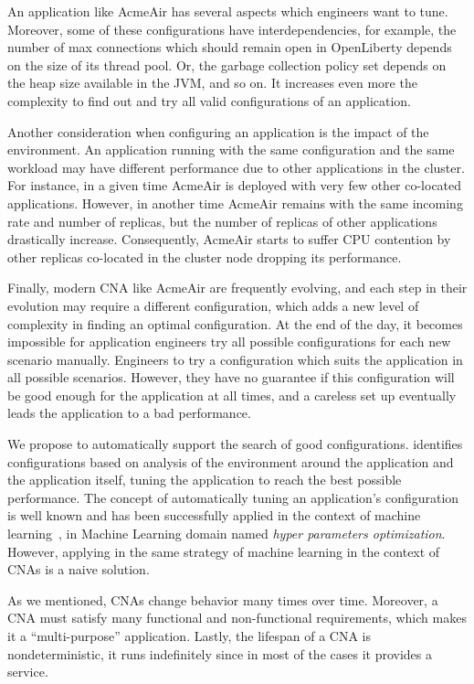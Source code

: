 An application like AcmeAir has several aspects which engineers want to tune.
Moreover, some of these configurations have interdependencies,
for example, the number of max connections which should remain open in
OpenLiberty depends on the size of its thread pool. Or, the garbage collection
policy set depends on the heap size available in the JVM, and so on. It
increases even more the complexity to find out and try all valid configurations
of an application.

Another consideration when configuring an application is the impact of the
environment. An application running with the same configuration and the same
workload may have different performance due to other applications in the
cluster. For instance, in a given time AcmeAir is deployed with very few other
co-located applications.  However, in another time AcmeAir remains with the same
incoming rate and number of replicas, but the number of replicas of other
applications drastically increase.  Consequently, AcmeAir starts to suffer CPU
contention by other replicas co-located in the cluster node dropping its
performance.

Finally, modern CNA like AcmeAir are frequently evolving, and each step in their
evolution may require a different configuration, which adds a new level of
complexity in finding an optimal configuration. At the end of the day, it
becomes impossible for application engineers try all possible configurations for
each new scenario manually. Engineers to try a configuration which suits the
application in all possible scenarios.  However, they have no guarantee if this
configuration will be good enough for the application at all times, and a
careless set up eventually leads the application to a bad performance.

We propose \name to automatically support the search of good configurations.
\name identifies configurations based on analysis of the environment around the
application and the application itself, tuning the application to reach the best
possible performance. The concept of automatically tuning an application's
configuration is well known and has been successfully applied in the context of
machine learning~\cite{}, in Machine Learning domain named \emph{hyper
parameters optimization}.  However, applying in the same strategy of machine
learning in the context of CNAs is a naive solution.

As we mentioned, CNAs change behavior many times over time.  Moreover, a CNA
must satisfy many functional and non-functional requirements, which makes it a
``multi-purpose'' application.  Lastly, the lifespan of a CNA is
nondeterministic, it runs indefinitely since in most of the cases it provides a
service.

